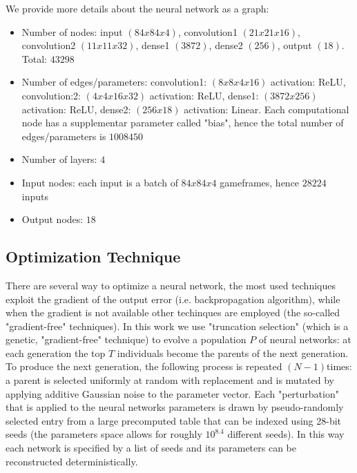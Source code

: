 \documentclass[11pt]{scrartcl} %
\begin{document}
We provide more details about the neural network as a graph:
\begin{itemize}
	\item Number of nodes: input $(84x84x4)$, convolution1 $(21x21x16)$, convolution2 $(11x11x32)$, dense1 $(3872)$, dense2 $(256)$, output $(18)$. Total: $43298$
	\item Number of edges/parameters: convolution1: $(8x8x4x16)$ activation: ReLU, convolution:2: $(4x4x16x32)$ activation: ReLU, dense1: $(3872x256)$ activation: ReLU, dense2: $(256x18)$ activation: Linear. Each computational node has a supplementar parameter called "bias", hence the total number of edges/parameters is $1008450$
	\item Number of layers: $4$
	\item Input nodes: each input is a batch of $84x84x4$ gameframes, hence $28224$ inputs
	\item Output nodes: $18$
\end{itemize}


\subsection{Optimization Technique}

There are several way to optimize a neural network, the most used techniques exploit the gradient of the output error (i.e. backpropagation algorithm), while when the gradient is not available other techinques are employed (the so-called "gradient-free" techniques). In this work we use "truncation selection" (which is a genetic, "gradient-free" technique) to evolve a population $P$ of neural networks: at each generation the top $T$ individuals become the parents of the next generation. To produce the next generation, the following process is repeated $(N-1)$times: a parent is selected uniformly at random with replacement and is mutated by applying additive Gaussian noise to the parameter vector. Each "perturbation" that is applied to the neural networks parameters is drawn by pseudo-randomly selected entry from a large precomputed table that can be indexed using 28-bit seeds (the parameters space allows for roughly $10^{8.4}$ different seeds). In this way each network is specified by a list of seeds and its parameters can be reconstructed deterministically. \\

\end{document}
